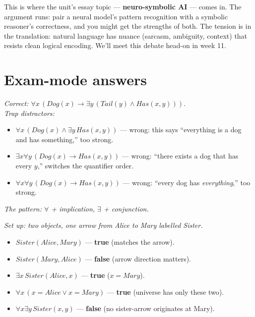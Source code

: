 \documentclass[11pt, a4paper]{article}
\begin{document}
\begin{notebox}
This is where the unit's essay topic — \textbf{neuro-symbolic AI} — comes in. The argument runs: pair a neural model's pattern recognition with a symbolic reasoner's correctness, and you might get the strengths of both. The tension is in the translation: natural language has nuance (sarcasm, ambiguity, context) that resists clean logical encoding. We'll meet this debate head-on in week 11.
\end{notebox}

\section{Exam-mode answers}

\begin{exambox}
\textit{Correct: $\forall x \, (Dog(x) \rightarrow \exists y \, (Tail(y) \land Has(x, y)))$.}\\[0.3em]
\textit{Trap distractors:}
\begin{itemize}[leftmargin=*, itemsep=0pt, topsep=0pt]
  \item $\forall x \, (Dog(x) \land \exists y \, Has(x, y))$ — wrong: this says ``everything is a dog and has something,'' too strong.
  \item $\exists x \forall y \, (Dog(x) \rightarrow Has(x, y))$ — wrong: ``there exists a dog that has every $y$,'' switches the quantifier order.
  \item $\forall x \forall y \, (Dog(x) \rightarrow Has(x, y))$ — wrong: ``every dog has \emph{everything},'' too strong.
\end{itemize}
\textit{The pattern: $\forall$ + implication, $\exists$ + conjunction.}
\end{exambox}

\begin{exambox}
\textit{Set up: two objects, one arrow from Alice to Mary labelled Sister.}
\begin{itemize}[leftmargin=*, itemsep=0pt, topsep=0pt]
  \item $Sister(Alice, Mary)$ — \textbf{true} (matches the arrow).
  \item $Sister(Mary, Alice)$ — \textbf{false} (arrow direction matters).
  \item $\exists x \, Sister(Alice, x)$ — \textbf{true} ($x = Mary$).
  \item $\forall x \, (x = Alice \lor x = Mary)$ — \textbf{true} (universe has only these two).
  \item $\forall x \exists y \, Sister(x, y)$ — \textbf{false} (no sister-arrow originates at Mary).
\end{itemize}
\end{exambox}
\end{document}
